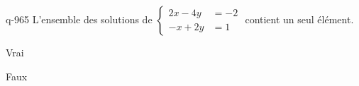 \begin{truefalse}{q-965}
L'ensemble des solutions de $\begin{cases}2x-4y &= -2 \\ -x+2y &= 1\end{cases}$ contient un seul élément.
\item Vrai
\item* Faux
\end{truefalse}

